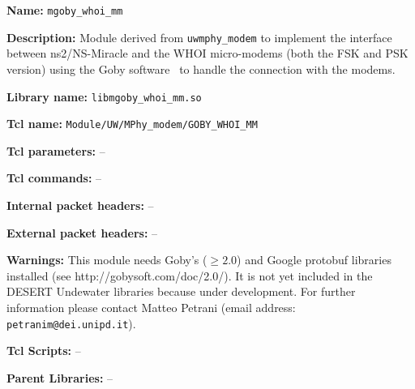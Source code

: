 \begin{description}
   \item {\bf Name:} {\tt mgoby\_whoi\_mm}
   \item {\bf Description:} Module derived from {\tt uwmphy\_modem} to implement the interface between ns2/NS-Miracle and the WHOI micro-modems (both the FSK and PSK version) using the Goby software~\cite{Goby} to handle the connection with the modems.
   \item {\bf Library name:} {\tt libmgoby\_whoi\_mm.so}
   \item {\bf Tcl name:} {\tt Module/UW/MPhy\_modem/GOBY\_WHOI\_MM} 
   \item {\bf Tcl parameters:} --
   \item {\bf Tcl commands:} --
   \item {\bf Internal packet headers:} --
   \item {\bf External packet headers:} --
   \item {\bf Warnings:} This module needs Goby's ($\geq 2.0$) and Google protobuf libraries installed (see http://gobysoft.com/doc/2.0/). It is not yet included in the DESERT Undewater libraries because under development. For further information please contact Matteo Petrani (email address: {\tt petranim@dei.unipd.it}).
   \item {\bf Tcl Scripts:} -- 
   \item {\bf Parent Libraries:} --
\end{description}

\vspace{1 cm}

